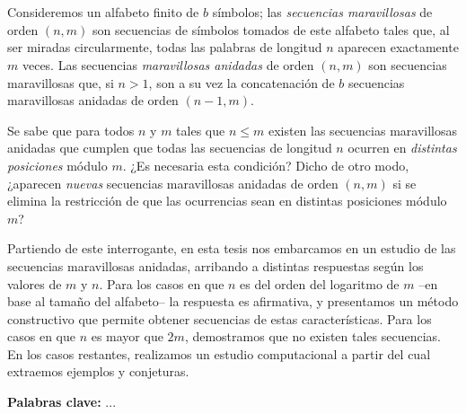 \chapter*{\runtitulo}

Consideremos un alfabeto finito de $b$ símbolos; las \emph{secuencias maravillosas}
de orden $(n,m)$ son secuencias de símbolos tomados de este alfabeto
tales que, al ser miradas circularmente, todas las
palabras de longitud $n$ aparecen exactamente $m$ veces.
Las secuencias \emph{maravillosas anidadas} de orden $(n,m)$ son secuencias
maravillosas que, si $n > 1$, son a su vez la concatenación de $b$ secuencias
maravillosas anidadas de orden $(n-1, m)$.

Se sabe que para todos $n$ y $m$ tales que $n \leq m$ existen las secuencias
maravillosas anidadas que cumplen que todas las secuencias de longitud $n$
ocurren en \emph{distintas posiciones} módulo $m$.
¿Es necesaria esta condición? Dicho de otro modo, ¿aparecen \emph{nuevas} secuencias
maravillosas anidadas de orden $(n,m)$ si se elimina la restricción de que las
ocurrencias sean en distintas posiciones módulo $m$?

Partiendo de este interrogante, en esta tesis nos embarcamos en un estudio de
las secuencias maravillosas anidadas, arribando a distintas respuestas según los
valores de $m$ y $n$. Para los casos en que $n$ es del orden del logaritmo de
$m$ --en base al tamaño del alfabeto-- la respuesta es afirmativa, y presentamos
un método constructivo que permite obtener secuencias de estas características.
Para los casos en que $n$ es mayor que $2m$, demostramos que no existen tales
secuencias. En los casos restantes, realizamos un estudio computacional a partir
del cual extraemos ejemplos y conjeturas.

\bigskip

\noindent\textbf{Palabras clave:} ...